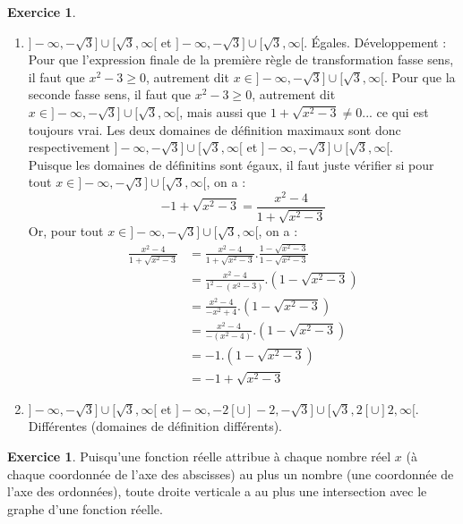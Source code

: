 \documentclass[a4paper,13pt]{scrreprt}
\theoremstyle{plain}
\theoremstyle{definition}
\newtheorem{exo}[subsection]{Exercice}
\begin{document}
\begin{exo} ~~\\
	\begin{enumerate}
		\item $]-\infty,-\sqrt{3}] \cup [\sqrt{3},\infty[$ et $]-\infty,-\sqrt{3}] \cup [\sqrt{3},\infty[$. \'Egales. Développement :\\
		Pour que l'expression finale de la première règle de transformation fasse sens, il faut que $x^2-3 \ge 0$, autrement dit $x \in ]-\infty,-\sqrt{3}] \cup [\sqrt{3},\infty[$. Pour que la seconde fasse sens, il faut que  $x^2-3 \ge 0$, autrement dit $x \in ]-\infty,-\sqrt{3}] \cup [\sqrt{3},\infty[$, mais aussi que $1 + \sqrt{x^2-3} \neq 0$... ce qui est toujours vrai. Les deux domaines de définition maximaux sont donc respectivement $]-\infty,-\sqrt{3}] \cup [\sqrt{3},\infty[$ et $]-\infty,-\sqrt{3}] \cup [\sqrt{3},\infty[$. \\
		Puisque les domaines de définitins sont égaux, il faut juste vérifier si pour tout $x \in ]-\infty,-\sqrt{3}] \cup [\sqrt{3},\infty[$, on a :
		$$-1 + \sqrt{x^2 - 3} = \frac{x^2-4}{1 + \sqrt{x^2-3}}$$
		Or, pour tout $x \in ]-\infty,-\sqrt{3}] \cup [\sqrt{3},\infty[$, on a :
		\begin{align*}
		\frac{x^2-4}{1 + \sqrt{x^2-3}} &= \frac{x^2-4}{1 + \sqrt{x^2-3}} . \frac{1 - \sqrt{x^2-3}}{1 - \sqrt{x^2-3}} \\
		&= \frac{x^2-4}{1^2 - (x^2-3)} . (1 - \sqrt{x^2-3}) \\
		&= \frac{x^2-4}{- x^2+4} . (1 - \sqrt{x^2-3})\\
		&= \frac{x^2-4}{- (x^2-4)} . (1 - \sqrt{x^2-3})\\
		&= -1 . (1 - \sqrt{x^2-3}) \\
		&= -1 + \sqrt{x^2-3}
		\end{align*}
		\item $]-\infty,-\sqrt{3}] \cup [\sqrt{3},\infty[$ et $]-\infty,-2[ \cup ]-2,-\sqrt{3}] \cup [\sqrt{3},2[ \cup ]2,\infty[$. Différentes (domaines de définition différents).
	\end{enumerate}
\end{exo}

\begin{exo}
	Puisqu'une fonction réelle attribue à chaque nombre réel $x$ (à chaque coordonnée de l'axe des abscisses) au plus un nombre (une coordonnée de l'axe des ordonnées), toute droite verticale a au plus une intersection avec le graphe d'une fonction réelle.
\end{exo}
\end{document}
